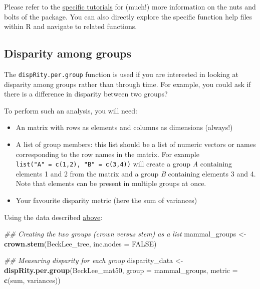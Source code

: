 \documentclass[
]{book}
\newenvironment{Shaded}{\begin{snugshade}}{\end{snugshade}}
\newcommand{\CommentTok}[1]{\textcolor[rgb]{0.56,0.35,0.01}{\textit{#1}}}
\newcommand{\DataTypeTok}[1]{\textcolor[rgb]{0.13,0.29,0.53}{#1}}
\newcommand{\KeywordTok}[1]{\textcolor[rgb]{0.13,0.29,0.53}{\textbf{#1}}}
\newcommand{\NormalTok}[1]{#1}
\newcommand{\OtherTok}[1]{\textcolor[rgb]{0.56,0.35,0.01}{#1}}
\newcommand{\StringTok}[1]{\textcolor[rgb]{0.31,0.60,0.02}{#1}}
\providecommand{\tightlist}{%
  \setlength{\itemsep}{0pt}\setlength{\parskip}{0pt}}
\begin{document}
Please refer to the \protect\hyperlink{specific-tutorial}{specific tutorials} for (much!) more information on the nuts and bolts of the package.
You can also directly explore the specific function help files within R and navigate to related functions.

\hypertarget{disparity-among-groups}{%
\subsection{Disparity among groups}\label{disparity-among-groups}}

The \texttt{dispRity.per.group} function is used if you are interested in looking at disparity among groups rather than through time.
For example, you could ask if there is a difference in disparity between two groups?

To perform such an analysis, you will need:

\begin{itemize}
\tightlist
\item
  An matrix with rows as elements and columns as dimensions (always!)
\item
  A list of group members: this list should be a list of numeric vectors or names corresponding to the row names in the matrix. For example \texttt{list("A"\ =\ c(1,2),\ "B"\ =\ c(3,4))} will create a group \emph{A} containing elements 1 and 2 from the matrix and a group \emph{B} containing elements 3 and 4. Note that elements can be present in multiple groups at once.
\item
  Your favourite disparity metric (here the sum of variances)
\end{itemize}

Using the \citet{beckancient2014} data described \protect\hyperlink{example-data}{above}:

\begin{Shaded}
\begin{Highlighting}[]
\CommentTok{\#\# Creating the two groups (crown versus stem) as a list}
\NormalTok{mammal\_groups \textless{}{-}}\StringTok{ }\KeywordTok{crown.stem}\NormalTok{(BeckLee\_tree, }\DataTypeTok{inc.nodes =} \OtherTok{FALSE}\NormalTok{)}

\CommentTok{\#\# Measuring disparity for each group}
\NormalTok{disparity\_data \textless{}{-}}\StringTok{ }\KeywordTok{dispRity.per.group}\NormalTok{(BeckLee\_mat50,}
                                     \DataTypeTok{group =}\NormalTok{ mammal\_groups,}
                                     \DataTypeTok{metric =} \KeywordTok{c}\NormalTok{(sum, variances))}
\end{Highlighting}
\end{Shaded}
\end{document}
